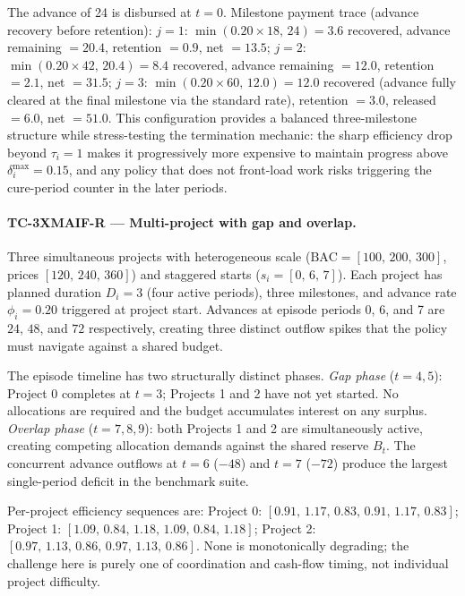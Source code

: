 The advance of 24 is disbursed at $t=0$.  Milestone payment trace
(advance recovery before retention):
$j=1$: $\min(0.20 \times 18,\, 24) = 3.6$ recovered, advance
remaining $= 20.4$, retention $= 0.9$, net $= 13.5$;
$j=2$: $\min(0.20 \times 42,\, 20.4) = 8.4$ recovered, advance
remaining $= 12.0$, retention $= 2.1$, net $= 31.5$;
$j=3$: $\min(0.20 \times 60,\, 12.0) = 12.0$ recovered (advance fully
cleared at the final milestone via the standard rate), retention $= 3.0$,
released $= 6.0$, net $= 51.0$.
This configuration provides a balanced three-milestone structure while
stress-testing the termination mechanic: the sharp efficiency drop
beyond $\tau_i = 1$ makes it progressively more expensive to maintain
progress above $\delta^{\max}_i = 0.15$, and any policy that does not
front-load work risks triggering the cure-period counter in the later
periods.

\paragraph{TC-3XMAIF-R --- Multi-project with gap and overlap.}
Three simultaneous projects with heterogeneous scale
($\mathrm{BAC} = [100,\, 200,\, 300]$, prices $[120,\, 240,\, 360]$)
and staggered starts ($s_i = [0,\, 6,\, 7]$).  Each project has
planned duration $D_i = 3$ (four active periods), three milestones, and
advance rate $\phi_i = 0.20$ triggered at project start.
Advances at episode periods 0, 6, and 7 are $24$, $48$, and $72$
respectively, creating three distinct outflow spikes that the policy
must navigate against a shared budget.

The episode timeline has two structurally distinct phases.
\emph{Gap phase} ($t = 4, 5$): Project 0 completes at $t = 3$; Projects
1 and 2 have not yet started.  No allocations are required and the
budget accumulates interest on any surplus.
\emph{Overlap phase} ($t = 7, 8, 9$): both Projects 1 and 2 are
simultaneously active, creating competing allocation demands against the
shared reserve $B_t$.  The concurrent advance outflows at $t = 6$
($-48$) and $t = 7$ ($-72$) produce the largest single-period
deficit in the benchmark suite.

Per-project efficiency sequences are:
Project 0: $[0.91,\, 1.17,\, 0.83,\, 0.91,\, 1.17,\, 0.83]$;
Project 1: $[1.09,\, 0.84,\, 1.18,\, 1.09,\, 0.84,\, 1.18]$;
Project 2: $[0.97,\, 1.13,\, 0.86,\, 0.97,\, 1.13,\, 0.86]$.
None is monotonically degrading; the challenge here is purely one of
coordination and cash-flow timing, not individual project difficulty.

